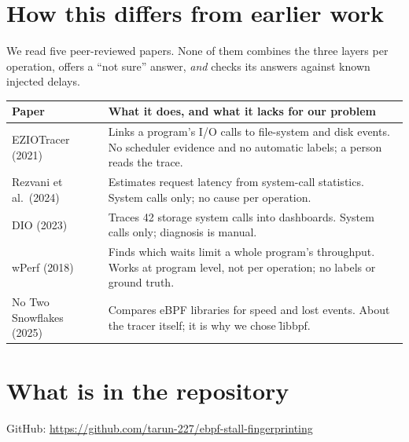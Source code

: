 \documentclass[11pt]{article}
\begin{document}
\section{How this differs from earlier work}

We read five peer-reviewed papers. None of them combines the three layers per operation, offers a ``not sure'' answer, \emph{and} checks its answers against known injected delays.

\begin{center}
\begin{tabularx}{\textwidth}{@{}lY@{}}
\toprule
Paper & What it does, and what it lacks for our problem \\
\midrule
EZIOTracer (2021) & Links a program's I/O calls to file-system and disk events. No scheduler evidence and no automatic labels; a person reads the trace. \\
Rezvani et al.\ (2024) & Estimates request latency from system-call statistics. System calls only; no cause per operation. \\
DIO (2023) & Traces 42 storage system calls into dashboards. System calls only; diagnosis is manual. \\
wPerf (2018) & Finds which waits limit a whole program's throughput. Works at program level, not per operation; no labels or ground truth. \\
No Two Snowflakes (2025) & Compares eBPF libraries for speed and lost events. About the tracer itself; it is why we chose \f{libbpf}. \\
\bottomrule
\end{tabularx}
\end{center}

\section{What is in the repository}

GitHub: \url{https://github.com/tarun-227/ebpf-stall-fingerprinting}
\end{document}
